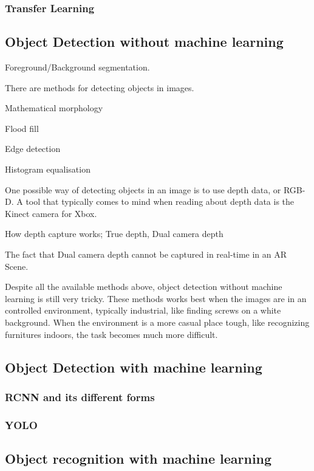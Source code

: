 \subsubsection{Transfer Learning}


\subsection{Object Detection without machine learning}

Foreground/Background segmentation.

There are methods for detecting objects in images. 

Mathematical morphology

Flood fill

Edge detection

Histogram equalisation

One possible way of detecting objects in an image is to use depth data, or RGB-D.
A tool that typically comes to mind when reading about depth data is the Kinect camera
for Xbox.

How depth capture works; True depth, Dual camera depth

The fact that Dual camera depth cannot be captured in real-time in an AR Scene.

Despite all the available methods above, object detection without machine learning is still very tricky. These methods works best when the images are in an controlled environment, typically industrial, like finding screws on a white background.
When the environment is a more casual place tough, like recognizing furnitures indoors, the task becomes much more difficult.

\subsection{Object Detection with machine learning}

\subsubsection{RCNN and its different forms}

\subsubsection{YOLO}

\subsection{Object recognition with machine learning}


\newpage
